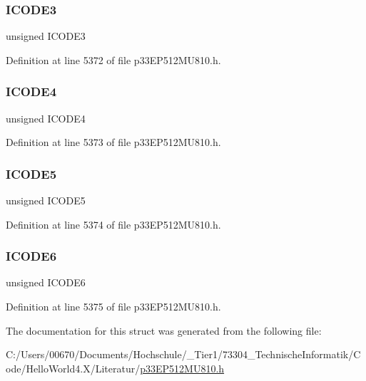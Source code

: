 \subsubsection{\texorpdfstring{I\+C\+O\+D\+E3}{ICODE3}}
{\footnotesize\ttfamily unsigned I\+C\+O\+D\+E3}



Definition at line 5372 of file p33\+E\+P512\+M\+U810.\+h.

\mbox{\label{structtag_c2_v_e_c_b_i_t_s_a436cd58140bad7a64953df17114bb50e}} 
\subsubsection{\texorpdfstring{I\+C\+O\+D\+E4}{ICODE4}}
{\footnotesize\ttfamily unsigned I\+C\+O\+D\+E4}



Definition at line 5373 of file p33\+E\+P512\+M\+U810.\+h.

\mbox{\label{structtag_c2_v_e_c_b_i_t_s_af29df0fe9fa862b03f7a3dc52a2fcca5}} 
\subsubsection{\texorpdfstring{I\+C\+O\+D\+E5}{ICODE5}}
{\footnotesize\ttfamily unsigned I\+C\+O\+D\+E5}



Definition at line 5374 of file p33\+E\+P512\+M\+U810.\+h.

\mbox{\label{structtag_c2_v_e_c_b_i_t_s_aec0244cced0a8f2c1703bb463f77de4b}} 
\subsubsection{\texorpdfstring{I\+C\+O\+D\+E6}{ICODE6}}
{\footnotesize\ttfamily unsigned I\+C\+O\+D\+E6}



Definition at line 5375 of file p33\+E\+P512\+M\+U810.\+h.



The documentation for this struct was generated from the following file\+:\begin{DoxyCompactItemize}
\item 
C\+:/\+Users/00670/\+Documents/\+Hochschule/\+\_\+\+Tier1/73304\+\_\+\+Technische\+Informatik/\+Code/\+Hello\+World4.\+X/\+Literatur/\hyperlink{p33_e_p512_m_u810_8h}{p33\+E\+P512\+M\+U810.\+h}\end{DoxyCompactItemize}
